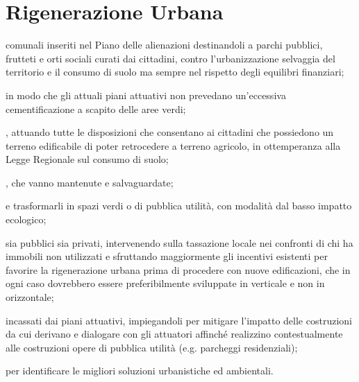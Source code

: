 \section{Rigenerazione Urbana}
 comunali inseriti nel Piano delle alienazioni destinandoli a parchi pubblici, frutteti e orti sociali curati dai cittadini, contro l'urbanizzazione selvaggia del territorio e il consumo di suolo ma sempre nel rispetto degli equilibri finanziari;

 in modo che gli attuali piani attuativi non prevedano un'eccessiva cementificazione a scapito delle aree verdi;

, attuando tutte le disposizioni che consentano ai cittadini che possiedono un terreno edificabile di poter retrocedere a terreno agricolo, in ottemperanza alla Legge Regionale sul consumo di suolo; 

, che vanno mantenute e salvaguardate;

 e trasformarli in spazi verdi o di pubblica utilità, con modalità dal basso impatto ecologico; 

 sia pubblici sia privati, intervenendo sulla tassazione locale nei confronti di chi ha immobili non utilizzati e sfruttando maggiormente gli incentivi esistenti per favorire la rigenerazione urbana prima di procedere con nuove edificazioni, che in ogni caso dovrebbero essere preferibilmente sviluppate in verticale e non in orizzontale;

 incassati dai piani attuativi, impiegandoli per mitigare l'impatto delle costruzioni da cui derivano e dialogare con gli attuatori affinché realizzino contestualmente alle costruzioni opere di pubblica utilità (e.g. parcheggi residenziali);

 per identificare le  migliori soluzioni urbanistiche ed ambientali.
